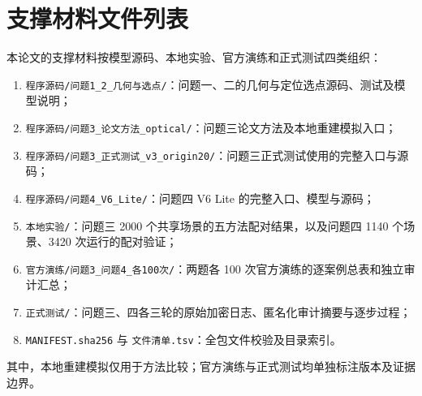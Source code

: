 \section{支撑材料文件列表}
本论文的支撑材料按模型源码、本地实验、官方演练和正式测试四类组织：
\begin{enumerate}
  \item \texttt{程序源码/问题1\_2\_几何与选点/}：问题一、二的几何与定位选点源码、测试及模型说明；
  \item \texttt{程序源码/问题3\_论文方法\_optical/}：问题三论文方法及本地重建模拟入口；
  \item \texttt{程序源码/问题3\_正式测试\_v3\_origin20/}：问题三正式测试使用的完整入口与源码；
  \item \texttt{程序源码/问题4\_V6\_Lite/}：问题四 V6 Lite 的完整入口、模型与源码；
  \item \texttt{本地实验/}：问题三 2000 个共享场景的五方法配对结果，以及问题四 1140 个场景、3420 次运行的配对验证；
  \item \texttt{官方演练/问题3\_问题4\_各100次/}：两题各 100 次官方演练的逐案例总表和独立审计汇总；
  \item \texttt{正式测试/}：问题三、四各三轮的原始加密日志、匿名化审计摘要与逐步过程；
  \item \texttt{MANIFEST.sha256} 与 \texttt{文件清单.tsv}：全包文件校验及目录索引。
\end{enumerate}
其中，本地重建模拟仅用于方法比较；官方演练与正式测试均单独标注版本及证据边界。
